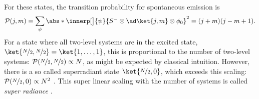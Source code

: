 For these states, the transition probability for spontaneous emission is \cite[Ch. 5]{larsonJaynesCummingsModelIts2021}
\begin{equation}
    \mathcal P(j,m) = \sum_{\psi} \abs*{\innerp[\big]{\psi}{\s-\otimes\ad \ket{j,m}\otimes  \phi_0}}^2
    = (j+m)(j-m+1)
    .
\end{equation}
For a state where all two-level systems are in the excited state, \(\ket{\nicefrac{N}{2}, \nicefrac{N}{2}} = \ket{1,\dots, 1}\), this is proportional to the number of two-level systems: \(\mathcal P(\nicefrac{N}{2}, \nicefrac{N}{2}) \propto N \), as might be expected by classical intuition.
However, there is a so called superradiant state \(\ket{\nicefrac{N}{2}, 0}\), which exceeds this scaling: \(\mathcal P(\nicefrac{N}{2}, 0) \propto N^2 \) \cite{larsonJaynesCummingsModelIts2021}.
This super linear scaling with the number of systems is called \emph{super radiance} \cite{dickeCoherenceSpontaneousRadiation1954}.

